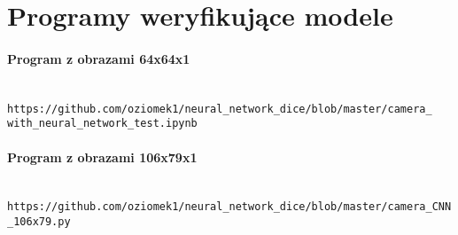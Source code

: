 \section{Programy weryfikujące modele}

\paragraph{Program z obrazami 64x64x1} \mbox{}\\
\texttt{https://github.com/oziomek1/neural\_network\_dice/blob/master/camera\_\\with\_neural\_network\_test.ipynb}

\paragraph{Program z obrazami 106x79x1} \mbox{}\\
\texttt{https://github.com/oziomek1/neural\_network\_dice/blob/master/camera\_CNN\_106x79.py}
